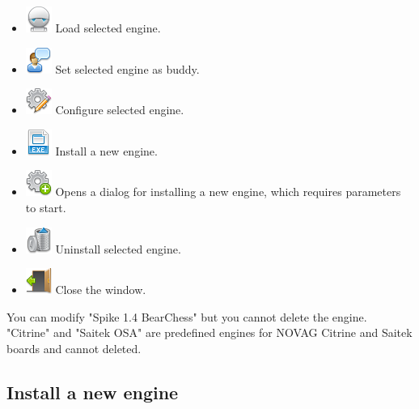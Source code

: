 \documentclass[11pt,a4paper]{article}
\begin{document}
\begin{itemize}
	\item \includegraphics[scale=0.5]{robot.png} Load selected engine.
    \item \includegraphics[scale=0.5]{user_comment.png} Set selected engine as buddy.
	\item \includegraphics[scale=0.5]{cog_edit.png} Configure selected engine.
	\item \includegraphics[scale=0.5]{file_extension_exe.png} Install a new engine.
    \item \includegraphics[scale=0.5]{cog_add.png} Opens a dialog for installing a new engine, which requires parameters to start.
	\item \includegraphics[scale=0.5]{bin.png} Uninstall selected engine.
	\item \includegraphics[scale=0.5]{door_out.png} Close the window.
\end{itemize}
You can modify "Spike 1.4 BearChess" but you cannot delete the engine.\\
"Citrine" and "Saitek OSA" are predefined engines for NOVAG Citrine and Saitek boards and cannot deleted.\\

\subsection{Install a new engine} \label{InstallEngine}
\end{document}
